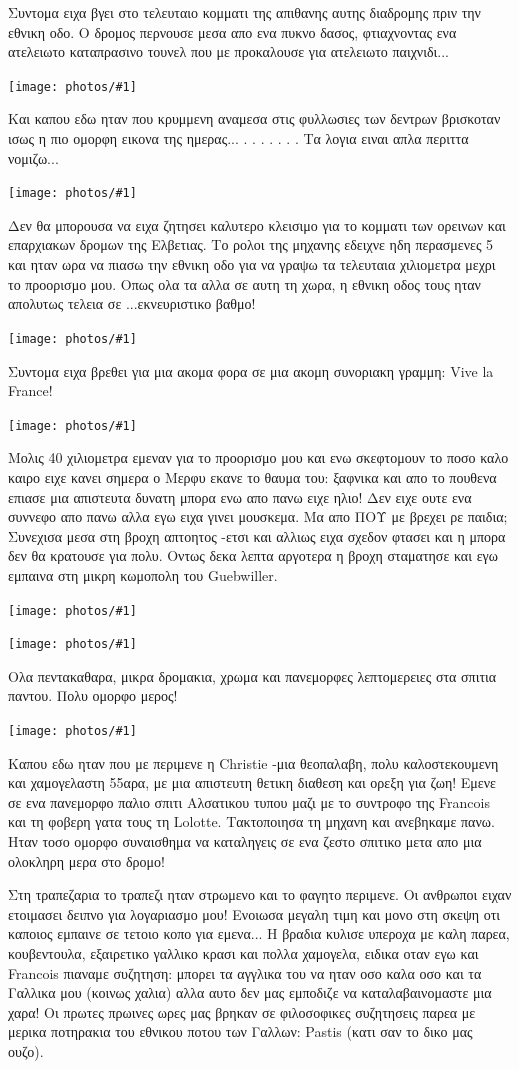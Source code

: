 \documentclass[11pt, letterpaper]{book}
\newcommand\photo[1]{\begin{center}\noindent\texttt{[image: photos/\#1]}\end{center}}
\begin{document}
Συντομα ειχα βγει στο τελευταιο κομματι της απιθανης αυτης διαδρομης πριν την εθνικη οδο.
Ο δρομος περνουσε μεσα απο ενα πυκνο δασος, φτιαχνοντας ενα ατελειωτο καταπρασινο τουνελ που με προκαλουσε για ατελειωτο παιχνιδι... 

\photo{73.jpg}

Και καπου εδω ηταν που κρυμμενη αναμεσα στις φυλλωσιες των δεντρων βρισκοταν ισως η πιο ομορφη εικονα της ημερας...
.
.
.
.
.
.
.
Τα λογια ειναι απλα περιττα νομιζω...

\photo{74.jpg}

Δεν θα μπορουσα να ειχα ζητησει καλυτερο κλεισιμο για το κομματι των ορεινων και επαρχιακων δρομων της Ελβετιας.
Το ρολοι της μηχανης εδειχνε ηδη περασμενες 5 και ηταν ωρα να πιασω την εθνικη οδο για να γραψω τα τελευταια χιλιομετρα μεχρι το προορισμο μου. Οπως ολα τα αλλα σε αυτη τη χωρα, η εθνικη οδος τους ηταν απολυτως τελεια σε ...εκνευριστικο βαθμο!

\photo{75.jpg}

Συντομα ειχα βρεθει για μια ακομα φορα σε μια ακομη συνοριακη γραμμη: Vive la France!

\photo{76.jpg}

Μολις 40 χιλιομετρα εμεναν για το προορισμο μου και ενω σκεφτομουν το ποσο καλο καιρο ειχε κανει σημερα ο Μερφυ εκανε το θαυμα του: ξαφνικα και απο το πουθενα επιασε μια απιστευτα δυνατη μπορα ενω απο πανω ειχε ηλιο! Δεν ειχε ουτε ενα συννεφο απο πανω αλλα εγω ειχα γινει μουσκεμα. Μα απο ΠΟΥ με βρεχει ρε παιδια;
Συνεχισα μεσα στη βροχη απτοητος -ετσι και αλλιως ειχα σχεδον φτασει και η μπορα δεν θα κρατουσε για πολυ.
Οντως δεκα λεπτα αργοτερα η βροχη σταματησε και εγω εμπαινα στη μικρη κωμοπολη του Guebwiller.

\photo{77.jpg}
\photo{78.jpg}

Ολα πεντακαθαρα, μικρα δρομακια, χρωμα και πανεμορφες λεπτομερειες στα σπιτια παντου. 
Πολυ ομορφο μερος!

\photo{79.jpg}

Καπου εδω ηταν που με περιμενε η Christie -μια θεοπαλαβη, πολυ καλοστεκουμενη και χαμογελαστη 55αρα, με μια απιστευτη θετικη διαθεση και ορεξη για ζωη! Εμενε σε ενα πανεμορφο παλιο σπιτι Αλσατικου τυπου μαζι με το συντροφο της Francois και τη φοβερη γατα τους τη Lolotte.
Τακτοποιησα τη μηχανη και ανεβηκαμε πανω. Ηταν τοσο ομορφο συναισθημα να καταληγεις σε ενα ζεστο σπιτικο μετα απο μια ολοκληρη μερα στο δρομο!

Στη τραπεζαρια το τραπεζι ηταν στρωμενο και το φαγητο περιμενε. Οι ανθρωποι ειχαν ετοιμασει δειπνο για λογαριασμο μου! Ενοιωσα μεγαλη τιμη και μονο στη σκεψη οτι καποιος εμπαινε σε τετοιο κοπο για εμενα...
Η βραδια κυλισε υπεροχα με καλη παρεα, κουβεντουλα, εξαιρετικο γαλλικο κρασι και πολλα χαμογελα, ειδικα οταν εγω και Francois πιαναμε συζητηση: μπορει τα αγγλικα του να ηταν οσο καλα οσο και τα Γαλλικα μου (κοινως χαλια) αλλα αυτο δεν μας εμποδιζε να καταλαβαινομαστε μια χαρα! 
Οι πρωτες πρωινες ωρες μας βρηκαν σε φιλοσοφικες συζητησεις παρεα με μερικα ποτηρακια του εθνικου ποτου των Γαλλων: Pastis (κατι σαν το δικο μας ουζο).
\end{document}
